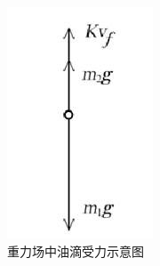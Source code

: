 \documentclass[fontset=windows,16pt]{ctexart}
\begin{document}
\begin{figure}[H]
    \centering
    \begin{minipage}[t]{0.2\textwidth}
        \centering
        \includegraphics[width=\textwidth]{img/受力1.png.jpg}
        \caption{重力场中油滴受力示意图}
        \label{fig:force1}
    \end{minipage}
    \hspace{1cm} %
    \begin{minipage}[t]{0.2\textwidth}
        \centering

\end{minipage}
\end{figure}
\end{document}

